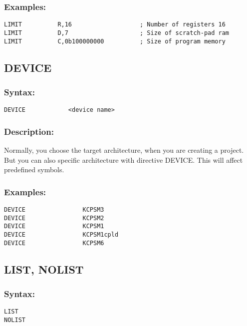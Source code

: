         \subsubsection{Examples:}
        {
            \usecodefont
            \verb'LIMIT          R,16                   ; Number of registers 16'\\
            \verb'LIMIT          D,7                    ; Size of scratch-pad ram   '\\
            \verb'LIMIT          C,0b100000000          ; Size of program memory '\\
        }

    \subsection{DEVICE}
        \subsubsection{Syntax:}
        \verb'DEVICE            <device name>'

        \subsubsection{Description:}
            Normally, you choose the target architecture, when you are creating a project. But you can also specific architecture with directive DEVICE. This will affect predefined symbols.

        \subsubsection{Examples:}
        {
            \usecodefont
            \verb'DEVICE                KCPSM3'\\
            \verb'DEVICE                KCPSM2'\\
            \verb'DEVICE                KCPSM1'\\
            \verb'DEVICE                KCPSM1cpld'\\
            \verb'DEVICE                KCPSM6'\\
        }

    \subsection{LIST, NOLIST}
        \subsubsection{Syntax:}
        {
            \usecodefont
            \verb'LIST'\\
            \verb'NOLIST'
        }


